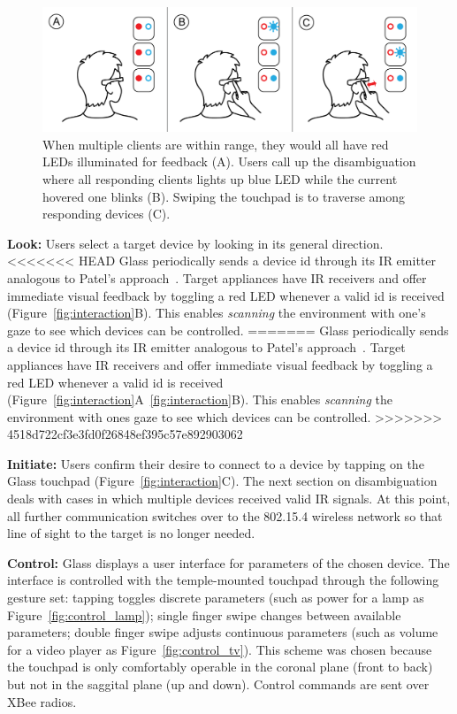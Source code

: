 \begin{figure}[t!]
\centering
\includegraphics[width=\columnwidth]{figures/stepbystep_multi.png}
\caption{When multiple clients are within range, they would all have red LEDs illuminated for feedback (A). Users call up the disambiguation where all responding clients lights up blue LED while the current hovered one blinks (B). Swiping the touchpad is to traverse among responding devices (C).}
\label{fig:interaction_multi}
\end{figure}

{\bf Look:} Users select a target device by looking in its general direction.
<<<<<<< HEAD
Glass periodically sends a device id through its IR emitter analogous to Patel's approach~\cite{patel_2-way_2003}. Target appliances have IR receivers and offer immediate visual feedback by toggling a red LED whenever a valid id is received (Figure~\ref{fig:interaction}B). This enables {\em scanning} the environment with one's gaze to see which devices can be controlled.
=======
Glass periodically sends a device id through its IR emitter analogous to Patel's approach~\cite{patel_2-way_2003}. Target appliances have IR receivers and offer immediate visual feedback by toggling a red LED whenever a valid id is received (Figure~\ref{fig:interaction}A~\ref{fig:interaction}B). This enables {\em scanning} the environment with ones gaze to see which devices can be controlled.
>>>>>>> 4518d722cf3e3fd0f26848ef395c57e892903062

{\bf Initiate:} Users confirm their desire to connect to a device by tapping on the Glass touchpad (Figure~\ref{fig:interaction}C). The next section on disambiguation deals with cases in which multiple devices received valid IR signals. At this point, all further communication switches over to the 802.15.4 wireless network so that line of sight to the target is no longer needed.

{\bf Control:} Glass displays a user interface for parameters of the chosen device. The interface is controlled with the temple-mounted touchpad through the following gesture set: tapping toggles discrete parameters (such as power for a lamp as Figure~\ref{fig:control_lamp}); single finger swipe changes between available parameters; double finger swipe adjusts continuous parameters (such as volume for a video player as Figure~\ref{fig:control_tv}). This scheme was chosen because the touchpad is only comfortably operable in the coronal plane (front to back) but not in the saggital plane (up and down). 
Control commands are sent over XBee radios.

